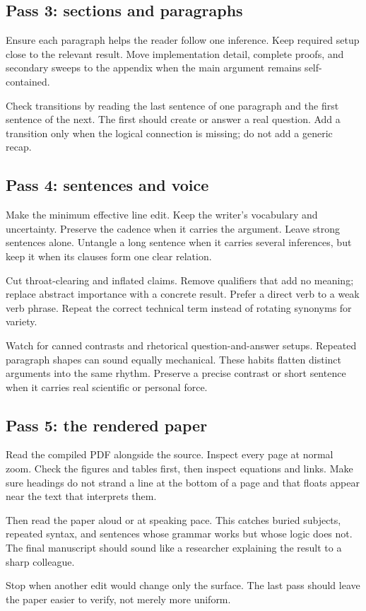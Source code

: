\subsection{Pass 3: sections and paragraphs}

Ensure each paragraph helps the reader follow one inference. Keep required
setup close to the relevant result. Move implementation detail, complete
proofs, and secondary sweeps to the appendix when the main argument remains
self-contained.

Check transitions by reading the last sentence of one paragraph and the first
sentence of the next. The first should create or answer a real question. Add a
transition only when the logical connection is missing; do not add a generic
recap.

\subsection{Pass 4: sentences and voice}

Make the minimum effective line edit. Keep the writer's vocabulary and
uncertainty. Preserve the cadence when it carries the argument. Leave strong
sentences alone. Untangle a long sentence when it carries several inferences,
but keep it when its clauses form one clear relation.

Cut throat-clearing and inflated claims. Remove qualifiers that add no meaning;
replace abstract importance with a concrete result. Prefer a direct verb to a
weak verb phrase. Repeat the correct technical term instead of rotating
synonyms for variety.

Watch for canned contrasts and rhetorical question-and-answer setups. Repeated
paragraph shapes can sound equally mechanical. These habits flatten distinct
arguments into the same rhythm. Preserve a precise contrast or short sentence
when it carries real scientific or personal force.

\subsection{Pass 5: the rendered paper}

Read the compiled PDF alongside the source. Inspect every page at normal zoom.
Check the figures and tables first, then inspect equations and links. Make sure
headings do not strand a line at the bottom of a page and that floats appear
near the text that interprets them.

Then read the paper aloud or at speaking pace. This catches buried subjects,
repeated syntax, and sentences whose grammar works but whose logic does not.
The final manuscript should sound like a researcher explaining the result to a
sharp colleague.

Stop when another edit would change only the surface. The last pass should
leave the paper easier to verify, not merely more uniform.
